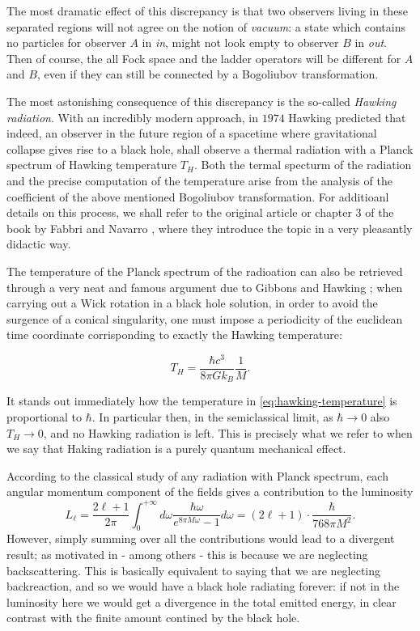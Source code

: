 The most dramatic effect of this discrepancy is that two observers living in these separated regions will not agree on the notion of \emph{vacuum}: a state which contains no particles for observer \(A\) in \emph{in}, might not look empty to observer \(B\) in \emph{out}.
Then of course, the all Fock space and the ladder operators will be different for \(A\) and \(B\), even if they can still be connected by a Bogoliubov transformation.

The most astonishing consequence of this discrepancy is the so-called \emph{Hawking radiation}. With an incredibly modern approach, in \(1974\) Hawking predicted that indeed, an observer in the future region of a spacetime where gravitational collapse gives rise to a black hole, shall observe a thermal radiation with a Planck spectrum of Hawking temperature \(T_H\). Both the termal specturm of the radiation and the precise computation of the temperature arise from the analysis of the coefficient of the above mentioned Bogoliubov transformation. For additioanl details on this process, we shall refer to the original article \cite[]{hawking1975particle} or chapter \(3\) of the book by Fabbri and Navarro \cite[]{fabbri2005modeling}, where they introduce the topic in a very pleasantly didactic way.

The temperature of the Planck spectrum of the radioation can also be retrieved through a very neat and famous argument due to Gibbons and Hawking \cite[]{gibbons1993action}; when carrying out a Wick rotation in a black hole solution, in order to avoid the surgence of a conical singularity, one must impose a periodicity of the euclidean time coordinate corrisponding to exactly the Hawking temperature:

\begin{equation}
	\label{eq:hawking-temperature}
	T_H = \frac{\hbar c^3}{8\pi Gk_B}\frac{1}{M}.
\end{equation}

\begin{remark}
	It stands out immediately how the temperature in \eqref{eq:hawking-temperature} is proportional to \(\hbar\). In particular then, in the semiclassical limit, as \(\hbar \rightarrow 0\) also \(T_H \rightarrow 0\), and no Hawking radiation is left. This is precisely what we refer to when we say that Haking radiation is a purely quantum mechanical effect.
\end{remark}

According to the classical study of any radiation with Planck spectrum, each angular momentum component of the fields gives a contribution to the luminosity
\[
L_{\ell} = \frac{2\ell + 1}{2\pi} \int_0^{+\infty} d\omega \frac{\hbar\omega}{e^{8\pi M\omega} - 1}	d\omega  = (2\ell + 1) \cdot\frac{\hbar}{768\pi M^2}.
\]
However, simply summing over all the contributions would lead to a divergent result; as motivated in \cite[]{fabbri2005modeling} - among others - this is because we are neglecting backscattering. This is basically equivalent to saying that we are neglecting backreaction, and so we would have a black hole radiating forever: if not in the luminosity here we would get a divergence in the total emitted energy, in clear contrast with the finite amount contined by the black hole.

